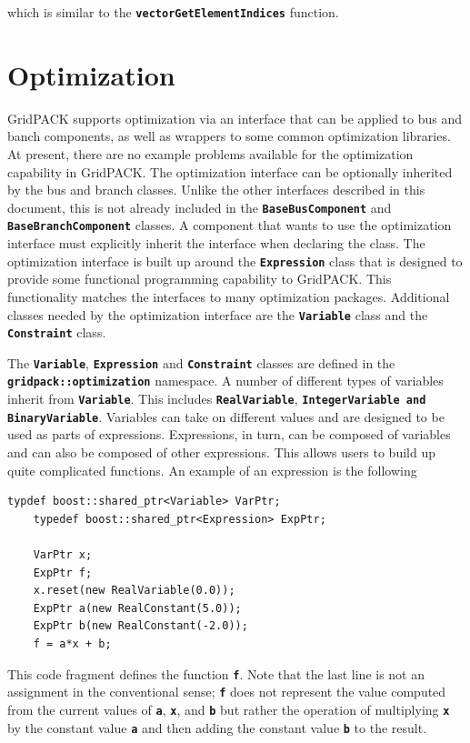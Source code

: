 \documentclass[12pt]{report} %
\begin{document}
which is similar to the \texttt{\textbf{vectorGetElementIndices}} function.

\chapter{Optimization}

GridPACK supports optimization via an interface that can be applied to bus and banch components, as well as wrappers to some common optimization libraries. At present, there are no example problems available for the optimization capability in GridPACK.
The optimization interface can be optionally inherited by the bus and branch classes. Unlike the other interfaces described in this document, this is not already included in the \texttt{\textbf{BaseBusComponent}} and \texttt{\textbf{BaseBranchComponent}} classes. A component that wants to use the optimization interface must explicitly inherit the interface when declaring the class. The optimization interface is built up around the \texttt{\textbf{Expression}} class that is designed to provide some functional programming capability to GridPACK. This functionality matches the interfaces to many optimization packages. Additional classes needed by the optimization interface are the \texttt{\textbf{Variable}} class and the \texttt{\textbf{Constraint}} class.

The \texttt{\textbf{Variable}}, \texttt{\textbf{Expression}} and \texttt{\textbf{Constraint}} classes are defined in the \texttt{\textbf{gridpack::optimization}} namespace. A number of different types of variables inherit from \texttt{\textbf{Variable}}. This includes \texttt{\textbf{RealVariable}}, \texttt{\textbf{IntegerVariable and BinaryVariable}}. Variables can take on different values and are designed to be used as parts of expressions. Expressions, in turn, can be composed of variables and can also be composed of other expressions. This allows users to build up quite complicated functions. An example of an expression is the following

{
\color{red}
\begin{Verbatim}[fontseries=b]
    typdef boost::shared_ptr<Variable> VarPtr;
    typedef boost::shared_ptr<Expression> ExpPtr;

    VarPtr x;
    ExpPtr f;
    x.reset(new RealVariable(0.0));
    ExpPtr a(new RealConstant(5.0));
    ExpPtr b(new RealConstant(-2.0));
    f = a*x + b;
\end{Verbatim}
}

This code fragment defines the function \texttt{\textbf{f}}. Note that the last line is not an assignment in the conventional sense; \texttt{\textbf{f}} does not represent the value computed from the current values of \texttt{\textbf{a}}, \texttt{\textbf{x}}, and \texttt{\textbf{b}} but rather the operation of multiplying \texttt{\textbf{x}} by the constant value \texttt{\textbf{a}} and then adding the constant value \texttt{\textbf{b}} to the result.
\end{document}
